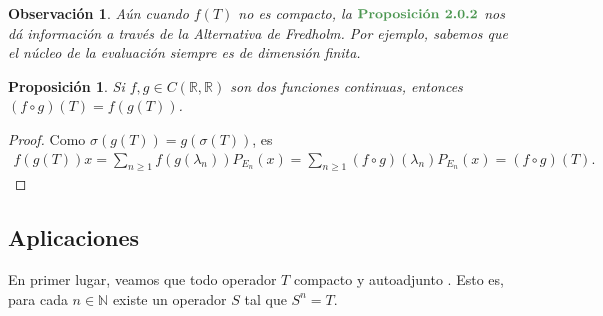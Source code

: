 \documentclass[11pt]{report}
\theoremstyle{colored}
\newtheorem{proposition}{Proposición}[section]
\newtheorem{remark}{Observación}[section]
\newcommand{\N}{\mathbb{N}}
\newcommand{\R}{\mathbb{R}}
\newcommand{\paint}[1]{\color{color}{#1}}
\newcommand{\tpaint}[1]{\paint{\textbf{#1}}}
\begin{document}
\begin{remark} Aún cuando $f(T)$ no es compacto, la $\tpaint{Proposición 2.0.2}$ nos dá información a través de la Alternativa de Fredholm. Por ejemplo, sabemos que el núcleo de la evaluación siempre es de dimensión finita.
\end{remark}

\begin{proposition} Si $f,g \in C(\R,\R)$ son dos funciones continuas, entonces $(f \circ g)(T) = f(g(T))$.
\end{proposition}
\begin{proof} Como $\sigma(g(T)) = g(\sigma(T))$, es
\begin{align*}
f(g(T))x = \sum_{n \geq 1}f(g(\lambda_n))P_{E_n}(x) = \sum_{n \geq 1}(f \circ g)(\lambda_n)P_{E_n}(x) = (f \circ g)(T). 
\end{align*}
\end{proof}

\subsection{Aplicaciones}

En primer lugar, veamos que todo operador $T$ compacto y autoadjunto . Esto es, para cada $n \in \N$ existe un operador $S$ tal que $S^n = T$.
\end{document}
